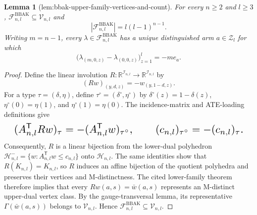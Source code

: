 \documentclass{article}
\newtheorem{lemma}{Lemma}
\begin{document}
\begin{lemma}[lem:bbak-upper-family-vertices-and-count]\label{lem:bbak-upper-family-vertices-and-count}
For every \(n\ge2\) and \(l\ge3\), \(\mathcal F^{\mathrm{BBAK}}_{n,l}\subseteq\mathcal V_{n,l}\) and \[|\mathcal F^{\mathrm{BBAK}}_{n,l}|=l(l-1)^{n-1}.\] Writing \(m=n-1\), every \(\lambda\in\mathcal F^{\mathrm{BBAK}}_{n,l}\) has a unique distinguished arm \(a\in\mathcal Z_l\) for which \[\bigl(\lambda_{(m,0,z)}-\lambda_{(0,0,z)}\bigr)_{z=1}^l=-m e_a.\]
\end{lemma}
\begin{proof}
Define the linear involution \(R:\mathbb R^{\mathcal I_{n,l}}\to\mathbb R^{\mathcal I_{n,l}}\) by
\[(Rw)_{(y,d,z)}=-w_{(y,1-d,z)}.\]
For a type \(\tau=(\delta,\eta)\), define \(\tau^\circ=(\delta^\circ,\eta^\circ)\) by \(\delta^\circ(z)=1-\delta(z)\), \(\eta^\circ(0)=\eta(1)\), and \(\eta^\circ(1)=\eta(0)\). The incidence-matrix and ATE-loading definitions give
\[
\makebox[\linewidth][c]{\resizebox{0.98\linewidth}{!}{\par\noindent \makebox[\linewidth][c]{\resizebox{0.98\linewidth}{!}{\(\displaystyle \displaystyle (A_{n,l}^{\mathsf T}Rw)_\tau=-(A_{n,l}^{\mathsf T}w)_{\tau^\circ},\qquad (c_{n,l})_{\tau^\circ}=-(c_{n,l})_\tau.\)}}\par\noindent}}
\]
Consequently, \(R\) is a linear bijection from the lower-dual polyhedron \(\mathcal H^-_{n,l}=\{w:A_{n,l}^{\mathsf T}w\le c_{n,l}\}\) onto \(\mathcal H_{n,l}\). The same identities show that \(R(K_{n,l})=K_{n,l}\), so \(R\) induces an affine bijection of the quotient polyhedra and preserves their vertices and M-distinctness. The cited lower-family theorem therefore implies that every \(Rw(a,s)=\bar w(a,s)\) represents an M-distinct upper-dual vertex class. By the gauge-transversal lemma, its representative \(\Gamma(\bar w(a,s))\) belongs to \(\mathcal V_{n,l}\). Hence \(\mathcal F^{\mathrm{BBAK}}_{n,l}\subseteq\mathcal V_{n,l}\).


\end{proof}
\end{document}
